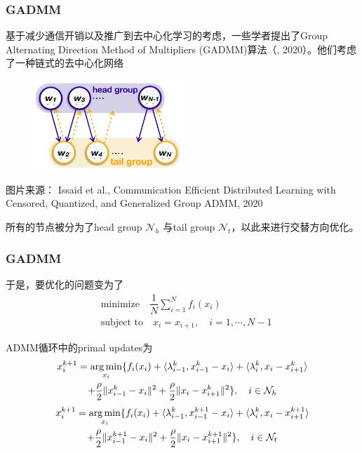 
\begin{frame}
\frametitle{GADMM}

基于减少通信开销以及推广到去中心化学习的考虑，一些学者提出了Group Alternating Direction Method of Multipliers (GADMM)算法（\cite{elgabli2020gadmm}, 2020）。他们考虑了一种链式的去中心化网络
\begin{figure}[H]
    \centering
    \includegraphics[width=0.5\textwidth,keepaspectratio]{images/GADMM.png}
\end{figure}
{\scriptsize 图片来源：\cite{issaid2020cq-ggadmm} Issaid et al., Communication Efficient Distributed Learning with Censored, Quantized, and Generalized Group ADMM, 2020}

所有的节点被分为了head group $\mathcal{N}_h$ 与tail group $\mathcal{N}_t$，以此来进行交替方向优化。

\end{frame}


\begin{frame}
\frametitle{GADMM}

于是，要优化的问题变为了
\begin{align*}
    & \text{minimize} \quad \dfrac{1}{N} \sum\limits_{i=1}^N f_i(x_i) \\
    & \text{subject to} \quad x_i = x_{i+1}, \quad i=1,\cdots,N-1
\end{align*}

ADMM循环中的primal updates为
\begin{multline*}
    x_i^{k+1} = \operatorname*{arg\,min}\limits_{x_i} \{ f_i(x_i) + \langle \lambda_{i-1}^k, x_{i-1}^k - x_i \rangle + \langle \lambda_{i}^k, x_{i} - x_{i+1}^k \rangle \\
    + \dfrac{\rho}{2}\lVert x_{i-1}^k - x_i \rVert^2 + \dfrac{\rho}{2}\lVert x_{i} - x_{i+1}^k \rVert^2 \}, \quad i \in \mathcal{N}_h
\end{multline*}
\begin{multline*}
    x_i^{k+1} = \operatorname*{arg\,min}\limits_{x_i} \{ f_i(x_i) + \langle \lambda_{i-1}^k, x_{i-1}^{k+1} - x_i \rangle + \langle \lambda_{i}^k, x_{i} - x_{i+1}^{k+1} \rangle \\
    + \dfrac{\rho}{2}\lVert x_{i-1}^{k+1} - x_i \rVert^2 + \dfrac{\rho}{2}\lVert x_{i} - x_{i+1}^{k+1} \rVert^2 \}, \quad i \in \mathcal{N}_t
\end{multline*}

\end{frame}

